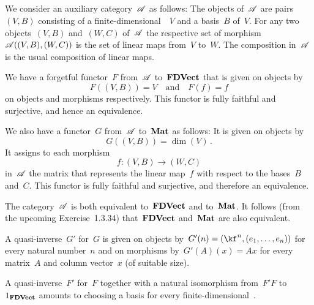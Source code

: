 \subsection{}

We consider an auxiliary category~$\mathscr{A}$ as follows:
The objects of~$\mathscr{A}$ are pairs~$(V, B)$ consisting of a finite-dimensional~\vectorspace{$\kf$}~$V$ and a basis~$B$ of~$V$.
For any two objects~$(V, B)$ and~$(W, C)$ of~$\mathscr{A}$ the respective set of morphism~$\mathscr{A}( (V, B), (W, C) )$ is the set of linear maps from~$V$ to~$W$.
The composition in~$\mathscr{A}$ is the usual composition of linear maps.

We have a forgetful functor~$F$ from~$\mathscr{A}$ to~$\mathbf{FDVect}$ that is given on objects by
\[
	F((V, B)) = V
	\quad\text{and}\quad
	F(f) = f
\]
on objects and morphisms respectively.
This functor is fully faithful and surjective, and hence an equivalence.

We also have a functor~$G$ from~$\mathscr{A}$ to~$\mathbf{Mat}$ as follows:
It is given on objects by
\[
	G( (V, B) ) = \dim(V) \,.
\]
It assigns to each morphism
\[
	f \colon (V, B) \to (W, C)
\]
in~$\mathscr{A}$ the matrix that represents the linear map~$f$ with respect to the bases~$B$ and~$C$.
This functor is fully faithful and surjective, and therefore an equivalence.

The category~$\mathscr{A}$ is both equivalent to~$\mathbf{FDVect}$ and to~$\mathbf{Mat}$.
It follows (from the upcoming Exercise~1.3.34) that~$\mathbf{FDVect}$ and~$\mathbf{Mat}$ are also equivalent.

A quasi-inverse~$G'$ for~$G$ is given on objects by~$G'(n) = (\kf^n, (e_1, \dotsc, e_n))$ for every natural number~$n$ and on morphisms by~$G'(A)(x) = Ax$ for every matrix~$A$ and column vector~$x$ (of suitable size).

A quasi-inverse~$F'$ for~$F$ together with a natural isomorphism from~$F' F$ to~$1_{\mathbf{FDVect}}$ amounts to choosing a basis for every finite-dimensional~\vectorspace{$\kf$}.
